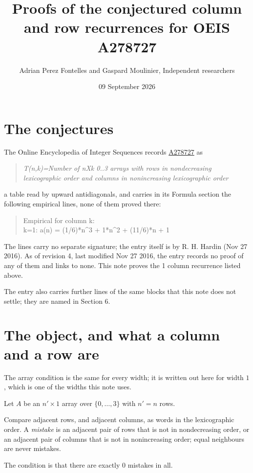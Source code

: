 \documentclass[11pt]{article}
\title{Proofs of the conjectured column and row recurrences for OEIS A278727}
\author{Adrian Perez Fontelles and Gaspard Moulinier, Independent researchers}
\date{09 September 2026}
\theoremstyle{definition}
\begin{document}
\maketitle
\section{The conjectures}

The Online Encyclopedia of Integer Sequences records \href{https://oeis.org/A278727}{A278727} as

\begin{quote}\itshape T(n,k)=Number of nXk 0..3 arrays with rows in nondecreasing lexicographic order and columns in nonincreasing lexicographic order\end{quote}

a table read by upward antidiagonals, and carries in its Formula section the following empirical lines, none of them proved there:

\begin{quote}\ttfamily Empirical for column k:\\
k=1: a(n) = (1/6)*n\textasciicircum{}3 + 1*n\textasciicircum{}2 + (11/6)*n + 1\end{quote}

The lines carry no separate signature; the entry itself is by R. H. Hardin (Nov 27 2016). As of revision 4, last modified Nov 27 2016, the entry records no proof of any of them and links to none. This note proves the 1 column recurrence listed above.

The entry also carries further lines of the same blocks that this note does not settle; they are named in Section 6.

\section{The object, and what a column and a row are}

The array condition is the same for every width; it is written out here for width $1$, which is one of the widths this note uses.

Let $A$ be an $n' \times 1$ array over $\{0,\dots,3\}$ with $n' = n$ rows.

Compare adjacent rows, and adjacent columns, as words in the lexicographic order. A {\itshape mistake} is an adjacent pair of rows that is not in nondecreasing order, or an adjacent pair of columns that is not in nonincreasing order; equal neighbours are never mistakes.

The condition is that there are exactly $0$ mistakes in all.
\end{document}

